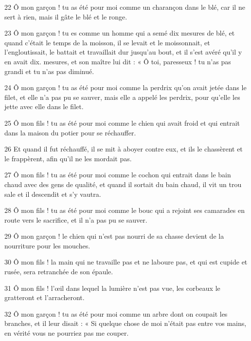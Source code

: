 \par 22 Ô mon garçon ! tu as été pour moi comme un charançon dans le blé, car il ne sert à rien, mais il gâte le blé et le ronge.

\par 23 Ô mon garçon ! tu es comme un homme qui a semé dix mesures de blé, et quand c'était le temps de la moisson, il se levait et le moissonnait, et l'engloutissait, le battait et travaillait dur jusqu'au bout, et il s'est avéré qu'il y en avait dix. mesures, et son maître lui dit : « Ô toi, paresseux ! tu n'as pas grandi et tu n'as pas diminué.

\par 24 Ô mon garçon ! tu as été pour moi comme la perdrix qu'on avait jetée dans le filet, et elle n'a pas pu se sauver, mais elle a appelé les perdrix, pour qu'elle les jette avec elle dans le filet.

\par 25 Ô mon fils ! tu as été pour moi comme le chien qui avait froid et qui entrait dans la maison du potier pour se réchauffer.

\par 26 Et quand il fut réchauffé, il se mit à aboyer contre eux, et ils le chassèrent et le frappèrent, afin qu'il ne les mordait pas.

\par 27 Ô mon fils ! tu as été pour moi comme le cochon qui entrait dans le bain chaud avec des gens de qualité, et quand il sortait du bain chaud, il vit un trou sale et il descendit et s'y vautra.

\par 28 Ô mon fils ! tu as été pour moi comme le bouc qui a rejoint ses camarades en route vers le sacrifice, et il n'a pas pu se sauver.

\par 29 Ô mon garçon ! le chien qui n'est pas nourri de sa chasse devient de la nourriture pour les mouches.

\par 30 Ô mon fils ! la main qui ne travaille pas et ne laboure pas, et qui est cupide et rusée, sera retranchée de son épaule.

\par 31 Ô mon fils ! l'œil dans lequel la lumière n'est pas vue, les corbeaux le gratteront et l'arracheront.

\par 32 Ô mon garçon ! tu as été pour moi comme un arbre dont on coupait les branches, et il leur disait : « Si quelque chose de moi n'était pas entre vos mains, en vérité vous ne pourriez pas me couper.

